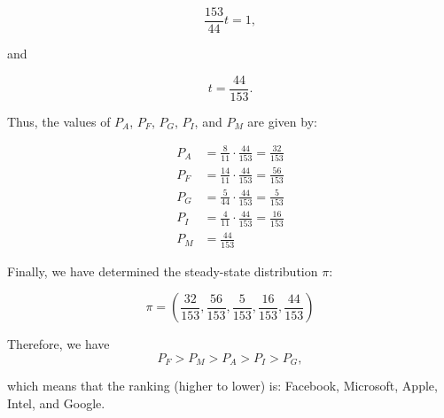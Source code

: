 \documentclass[12pt,a4paper]{article}
\begin{document}
\begin{solution}
\[
\frac{153}{44}t = 1,
\]

and

\[
t = \frac{44}{153}.
\]

Thus, the values of \( P_A \), \( P_F \), \( P_G \), \( P_I \), and \( P_M \) are given by:

\[
\begin{aligned}
    P_A &= \frac{8}{11} \cdot \frac{44}{153} = \frac{32}{153} \\
    P_F &= \frac{14}{11} \cdot \frac{44}{153} = \frac{56}{153} \\
    P_G &= \frac{5}{44} \cdot \frac{44}{153} = \frac{5}{153} \\
    P_I &= \frac{4}{11} \cdot \frac{44}{153} = \frac{16}{153} \\
    P_M &= \frac{44}{153}
\end{aligned}
\]

Finally, we have determined the steady-state distribution \( \pi \):

\[
\pi = \left(\frac{32}{153}, \frac{56}{153}, \frac{5}{153}, \frac{16}{153}, \frac{44}{153}\right)
\]

Therefore, we have 
\[
P_F > P_M > P_A > P_I > P_G,
\]

which means that the ranking (higher to lower) is: Facebook, Microsoft, Apple, Intel, and Google.
\end{solution}


\printbibliography
\end{document}
